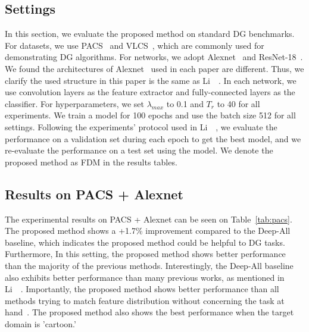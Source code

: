 \subsection{Settings}
In this section, we evaluate the proposed method on standard DG benchmarks. For datasets, we use PACS~\cite{Li2017dg} and VLCS~\cite{chen2013vlcs}, which are commonly used for demonstrating DG algorithms. For networks, we adopt Alexnet~\cite{Krizhevsky2012} and ResNet-18~\cite{He2016resnet}. We found the architectures of Alexnet~\cite{Krizhevsky2012} used in each paper are different. Thus, we clarify the used structure in this paper is the same as Li~\etal~\cite{li2019episodic}. In each network, we use convolution layers as the feature extractor and fully-connected layers as the classifier. For hyperparameters, we set $\lambda_{max}$ to 0.1 and $T_r$ to 40 for all experiments. We train a model for 100 epochs and use the batch size 512 for all settings. Following the experiments' protocol used in Li~\etal~\cite{Li2017dg}, we evaluate the performance on a validation set during each epoch to get the best model, and we re-evaluate the performance on a test set using the model. We denote the proposed method as FDM in the results tables.


\subsection{Results on PACS + Alexnet}
The experimental results on PACS + Alexnet can be seen on Table~\ref{tab:pacs}. The proposed method shows a +1.7\% improvement compared to the Deep-All baseline, which indicates the proposed method could be helpful to DG tasks. Furthermore, In this setting, the proposed method shows better performance than the majority of the previous methods. Interestingly, the Deep-All baseline also exhibits better performance than many previous works, as mentioned in Li~\etal~\cite{li2019episodic}. Importantly, the proposed method shows better performance than all methods trying to match feature distribution without concerning the task at hand~\cite{ghifary2015domain, ganin2016dann, muandet2013domaingeneralization}. The proposed method also shows the best performance when the target domain is 'cartoon.'

